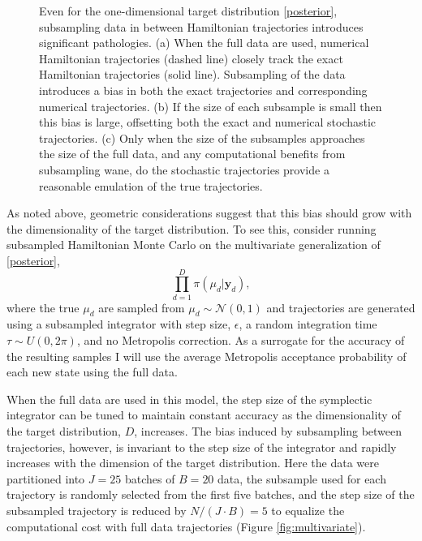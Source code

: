 \documentclass{article}
\begin{document}
\begin{figure}
\caption{Even for the one-dimensional target distribution \eqref{posterior}, subsampling
data in between Hamiltonian trajectories introduces significant pathologies.
(a) When the full data are used, numerical Hamiltonian trajectories (dashed line) 
closely track the exact Hamiltonian trajectories (solid line).  Subsampling of the
data introduces a bias in both the exact trajectories and corresponding
numerical trajectories.  (b) If the size of each subsample is small then this bias 
is large, offsetting both the exact and numerical stochastic trajectories. 
(c) Only when the size of the subsamples approaches the size of the full data, 
and any computational benefits from subsampling wane, do the stochastic 
trajectories provide a reasonable emulation of the true trajectories.}
\label{fig:level_sets}
\end{figure}

As noted above, geometric considerations suggest that this bias should grow with the 
dimensionality of the target distribution.  To see this, consider running subsampled
Hamiltonian Monte Carlo on the multivariate generalization of \eqref{posterior},
%
\begin{equation} \label{multivariate_posterior}
\prod_{d = 1}^{D} \pi \! \left( \mu_{d} | \mathbf{y}_{d} \right),
\end{equation}
%
where the true $\mu_{d}$ are sampled from $\mu_{d} \sim \mathcal{N} \! \left( 0, 1 \right)$
and trajectories are generated using a subsampled integrator with step size, $\epsilon$, a 
random integration time $\tau \sim U \! \left(0, 2 \pi \right)$, and no Metropolis
correction.  As a surrogate for the accuracy of the resulting samples I will use the 
average Metropolis acceptance probability of each new state using the full data.

When the full data are used in this model, the step size of the symplectic integrator can be 
tuned to maintain constant accuracy as the dimensionality of the target distribution, $D$, increases.
The bias induced by subsampling between trajectories, however, is invariant to the
step size of the integrator and rapidly increases with the dimension of the target distribution.
Here the data were partitioned into $J = 25$ batches of $B = 20$ data, the subsample
used for each trajectory is randomly selected from the first five batches, and the step size 
of the subsampled trajectory is reduced by $N / (J \cdot B) = 5$ to equalize the computational
cost with full data trajectories (Figure \ref{fig:multivariate}).
\end{document}
